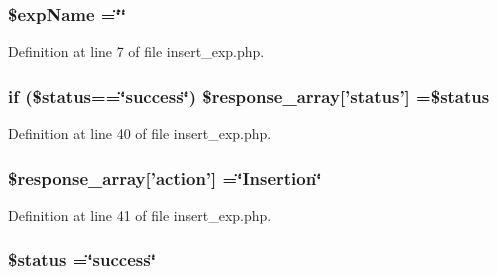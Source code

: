 \hypertarget{insert__exp_8php_a6478e66386fefd0e5fd6de22d695ffca}{
\subsubsection[{\$exp\-Name}]{\setlength{\rightskip}{0pt plus 5cm}\$exp\-Name =\char`\"{}\char`\"{}}}\label{insert__exp_8php_a6478e66386fefd0e5fd6de22d695ffca}


Definition at line 7 of file insert\-\_\-exp.\-php.

\hypertarget{insert__exp_8php_ac2f977cd15bb8f414765415d0c35971d}{
\subsubsection[{\$response\-\_\-array}]{\setlength{\rightskip}{0pt plus 5cm}if (\$status==\char`\"{}success\char`\"{}) \$response\-\_\-array\mbox{[}'status'\mbox{]} =\$status}}\label{insert__exp_8php_ac2f977cd15bb8f414765415d0c35971d}


Definition at line 40 of file insert\-\_\-exp.\-php.

\hypertarget{insert__exp_8php_ae768978a0cdc416c0d63d798c85c8784}{
\subsubsection[{\$response\-\_\-array}]{\setlength{\rightskip}{0pt plus 5cm}\$response\-\_\-array\mbox{[}'action'\mbox{]} =\char`\"{}Insertion\char`\"{}}}\label{insert__exp_8php_ae768978a0cdc416c0d63d798c85c8784}


Definition at line 41 of file insert\-\_\-exp.\-php.

\hypertarget{insert__exp_8php_a58391ea75f2d29d5d708d7050b641c33}{
\subsubsection[{\$status}]{\setlength{\rightskip}{0pt plus 5cm}\$status =\char`\"{}success\char`\"{}}}\label{insert__exp_8php_a58391ea75f2d29d5d708d7050b641c33}


